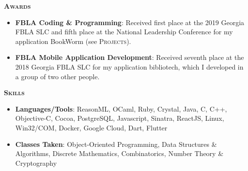 \documentclass{article}
\newcommand{\sectionHeader}[1]{{\large \textbf{\textsc{#1}}}\hspace{5pt}\xrfill[.5ex]{.4pt}}
\begin{document}
  \vspace{8pt}

  \sectionHeader{Awards}

  \vspace{3pt}

  \begin{itemize}
    \item \textbf{FBLA Coding \& Programming}: Received first place at the 2019 Georgia FBLA SLC and fifth place at the National Leadership Conference for my application BookWorm (see \textsc{Projects}).
    \item \textbf{FBLA Mobile Application Development}: Received seventh place at the 2018 Georgia FBLA SLC for my application bibliotech, which I developed in a group of two other people.
  \end{itemize}

  \vspace{8pt}

  \sectionHeader{Skills}
  \begin{itemize}
    \item \textbf{Languages/Tools}: ReasonML, OCaml, Ruby, Crystal, Java, C, C++, Objective-C, Cocoa, PostgreSQL, Javascript, Sinatra, ReactJS, Linux, Win32/COM, Docker, Google Cloud, Dart, Flutter
    \item \textbf{Classes Taken}: Object-Oriented Programming, Data Structures \& Algorithms, Discrete Mathematics, Combinatorics, Number Theory \& Cryptography
  \end{itemize}
\end{document}
